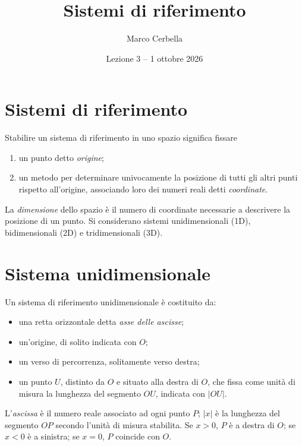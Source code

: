 \documentclass[11pt,a4paper]{article}
\title{Sistemi di riferimento}
\author{Marco Cerbella}
\date{Lezione 3 -- 1 ottobre 2026}
\theoremstyle{definition}
\begin{document}
\maketitle

\section{Sistemi di riferimento}

Stabilire un sistema di riferimento in uno spazio significa fissare
\begin{enumerate}
    \item un punto detto \emph{origine};
    \item un metodo per determinare univocamente la posizione di tutti gli altri punti rispetto all'origine, associando loro dei numeri reali detti \emph{coordinate}.
\end{enumerate}
La \emph{dimensione} dello spazio è il numero di coordinate necessarie a descrivere la posizione di un punto. Si considerano sistemi unidimensionali (1D), bidimensionali (2D) e tridimensionali (3D).

\section{Sistema unidimensionale}

Un sistema di riferimento unidimensionale è costituito da:
\begin{itemize}
    \item una retta orizzontale detta \emph{asse delle ascisse};
    \item un'origine, di solito indicata con $O$;
    \item un verso di percorrenza, solitamente verso destra;
    \item un punto $U$, distinto da $O$ e situato alla destra di $O$, che fissa come unità di misura la lunghezza del segmento $OU$, indicata con $|OU|$.
\end{itemize}
L'\emph{ascissa} è il numero reale associato ad ogni punto $P$; $|x|$ è la lunghezza del segmento $OP$ secondo l'unità di misura stabilita. Se $x > 0$, $P$ è a destra di $O$; se $x < 0$ è a sinistra; se $x = 0$, $P$ coincide con $O$.

\begin{center}
\end{center}
\end{document}
